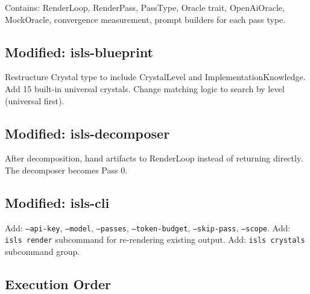 \documentclass[11pt,a4paper]{article}
\begin{document}
Contains: RenderLoop, RenderPass, PassType, Oracle trait,
OpenAiOracle, MockOracle, convergence measurement, prompt
builders for each pass type.

\subsection{Modified: isls-blueprint}

Restructure Crystal type to include CrystalLevel and
ImplementationKnowledge. Add 15 built-in universal crystals.
Change matching logic to search by level (universal first).

\subsection{Modified: isls-decomposer}

After decomposition, hand artifacts to RenderLoop instead of
returning directly. The decomposer becomes Pass 0.

\subsection{Modified: isls-cli}

Add: \texttt{--api-key}, \texttt{--model}, \texttt{--passes},
\texttt{--token-budget}, \texttt{--skip-pass}, \texttt{--scope}.
Add: \texttt{isls render} subcommand for re-rendering existing output.
Add: \texttt{isls crystals} subcommand group.

\subsection{Execution Order}
\end{document}
